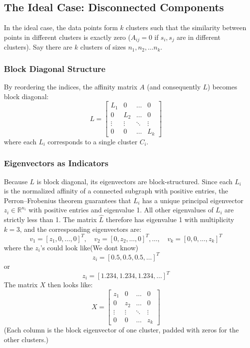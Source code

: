 \documentclass[11pt]{article}
\theoremstyle{plain}
\theoremstyle{definition}
\begin{document}
\subsection{The Ideal Case: Disconnected Components}
In the ideal case, the data points form $k$ clusters such that the similarity between points in different clusters is exactly zero ($A_{ij} = 0$ if $s_i, s_j$ are in different clusters). Say there are $k$ clusters of sizes $n_1, n_2,\dots n_k$.

\subsubsection{Block Diagonal Structure}
By reordering the indices, the affinity matrix $A$ (and consequently $L$) becomes block diagonal:
\[ L = \begin{bmatrix} L_1 & 0 & \dots & 0 \\ 0 & L_2 & \dots & 0 \\ \vdots & \vdots & \ddots & \vdots \\ 0 & 0 & \dots & L_k \end{bmatrix} \]
where each $L_i$ corresponds to a single cluster $C_i$.

\subsubsection{Eigenvectors as Indicators}
Because $L$ is block diagonal, its eigenvectors are block-structured. Since each $L_i$ is the normalized affinity of a connected subgraph with positive entries, the Perron--Frobenius theorem guarantees that $L_i$ has a unique principal eigenvector $z_i \in \mathbb{R}^{n_i}$ with positive entries and eigenvalue 1. All other eigenvalues of $L_i$ are strictly less than 1. The matrix $\hat{L}$ therefore has eigenvalue 1 with multiplicity $k = 3$, and the corresponding eigenvectors are:
\[ v_1 = [z_1, 0, \dots, 0]^T, \quad v_2 = [0, z_2, \dots, 0]^T, \dots, \quad v_k = [0, 0, \dots, z_k]^T \]
where the $z_i$'s could look like(We dont know)
\[z_i = [0.5, 0.5, 0.5, \dots]^T\] or \[z_i  = [1.234, 1.234, 1.234, \dots]^T\]
The matrix $X$ then looks like:
\[ X = \begin{bmatrix} z_1 & 0 & \dots & 0 \\ 0 & z_2 & \dots & 0 \\ \vdots & \vdots & \ddots & \vdots \\ 0 & 0 & \dots & z_k \end{bmatrix} \]
(Each column is the block eigenvector of one cluster, padded with zeros for the other clusters.)
\end{document}
